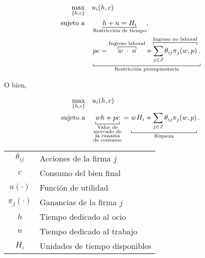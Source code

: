 \documentclass[8pt,a4paper]{extarticle}
\begin{document}
\begin{multicols}{3}
	\begin{equation*}
		\begin{aligned}
			\max_{\{h, c\}} \quad & u_i(h, c)                                                                                                                                                                                                                                                     \\
			\text{sujeto a} \quad & \underbracket[0.5pt][0.5pt]{h + n = H_i}_{\text{\normalfont Restricción de tiempo}},                                                                                                                                                                          \\
			                      & \underbracket[0.5pt]{pc = \overbracket[0.5pt]{w \; \cdot \;  n}^{\text{\normalfont Ingreso laboral}} + \overbracket[0.5pt]{\sum_{j \in J} \theta_{ij} \pi_j (w, p)}^{\text{\normalfont Ingreso no laboral}}.}_{\text{\normalfont Restricción presupuestaria}}
		\end{aligned}
	\end{equation*}

	O bien,

	\begin{equation*}
		\begin{aligned}
			\max_{\{h, c\}} \quad & u_i(h, c)                                                            \\
			\text{sujeto a} \quad & \underbracket[0.5pt]{wh + pc}_{\substack{\text{\normalfont Valor de} \\ \text{\normalfont mercado de} \\ \text{\normalfont la canasta} \\\text{\normalfont de consumo} }} = \underbracket[0.5pt]{wH_i + \sum_{j \in J} \theta_{ij} \pi_j (w, p)}_{\text{\normalfont Riqueza}}.
		\end{aligned}
	\end{equation*}

	\begin{center}
		\begin{tabular}{ c l }
			\hline
			$\theta_{ij}$  & Acciones de la firma $j$       \\
			$c$            & Consumo del bien final         \\
			$u(\cdot)$     & Función de utilidad            \\
			$\pi_j(\cdot)$ & Ganancias de la firma $j$      \\
			$h$            & Tiempo dedicado al ocio        \\
			$n$            & Tiempo dedicado al trabajo     \\
			$H_i$          & Unidades de tiempo disponibles \\
			\hline
		\end{tabular}
	\end{center}


\end{multicols}
\end{document}
